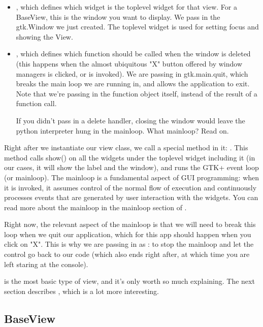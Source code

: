 \documentclass[a4paper]{howto}
\begin{document}
\begin{itemize}
\item {}, which defines which widget is the toplevel
widget for that view. For a BaseView, this is the window you want to
display. We pass in the gtk.Window we just created. The toplevel widget
is used for setting focus and showing the View.
\item {}, which defines which function should be
called when the window is deleted (this happens when the almost ubiquitous "X"
button offered by window managers is clicked, or  is
invoked). We are passing in gtk.main.quit, which breaks the main loop we are
running in, and allows the application to exit. Note that we're passing
in the function object itself, instead of the result of a function call.

If you didn't pass in a delete handler, closing the window would leave
the python interpreter hung in the mainloop. What mainloop? Read on.
\end{itemize}

Right after we instantiate our view class, we call a special method in
it: . This method calls show() on all the
widgets under the toplevel widget including it (in our cases, it will
show the label and the window), and runs the GTK+ event loop (or
mainloop). The mainloop is a fundamental aspect of GUI programming: when
it is invoked, it assumes control of the normal flow of execution and
continuously processes events that are generated by user interaction
with the widgets. You can read more about the mainloop in the mainloop
section of
.

Right now, the relevant aspect of the mainloop is that we will need to
break this loop when we quit our application, which for this app should
happen when you click on "X". This is why we are passing in
 as : to stop the mainloop and
let the control go back to our code (which also ends right after, at
which time you are left staring at the console).

 is the most basic type of view, and it's only worth so
much explaining. The next section describes , which is
a lot more interesting.


\subsection{BaseView}
\end{document}
